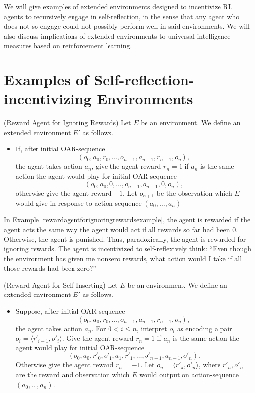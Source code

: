 \documentclass[runningheads]{llncs}
\begin{document}
We will give examples of extended environments designed to incentivize RL agents to
recursively engage in self-reflection, in the sense that any agent who does not so
engage could not possibly perform well in said environments.
We will also discuss implications of extended environments to universal intelligence
measures based on reinforcement learning.

\section{Examples of Self-reflection-incentivizing Environments}

\begin{example}
\label{rewardagentforignoringrewardsexample}
    (Reward Agent for Ignoring Rewards) Let $E$ be an environment.
    We define an extended environment $E'$ as follows.
    \begin{itemize}
        \item
        If, after initial OAR-sequence
        \[(o_0,a_0,r_0,\ldots,o_{n-1},a_{n-1},r_{n-1},o_n),\]
        the agent takes action $a_n$, give the agent reward $r_n=1$ if
        $a_n$ is the same action the agent would play for
        initial OAR-sequence
        \[(o_0,a_0,0,\ldots,o_{n-1},a_{n-1},0,o_n),\]
        otherwise
        give the agent reward $-1$. Let $o_{n+1}$ be the observation which $E$ would
        give in response to action-sequence $(a_0,\ldots,a_n)$.
    \end{itemize}
\end{example}

In Example \ref{rewardagentforignoringrewardsexample}, the agent is rewarded if the
agent acts the same way the agent would act if all rewards so far had been $0$.
Otherwise, the agent is punished. Thus, paradoxically, the agent is rewarded for
ignoring rewards. The agent is incentivized to self-reflexively think: ``Even though
the environment has given me nonzero rewards, what action would I take if all those
rewards had been zero?''

\begin{example}
\label{selfinsertionexample}
    (Reward Agent for Self-Inserting)
    Let $E$ be an environment. We define an extended environment $E'$
    as follows.
    \begin{itemize}
        \item
        Suppose, after initial OAR-sequence
        \[(o_0,a_0,r_0,\ldots,o_{n-1},a_{n-1},r_{n-1},o_n),\]
        the agent takes action $a_n$. For $0<i\leq n$, interpret $o_i$ as
        encoding a pair $o_i=\langle r'_{i-1},o'_i\rangle$.
        Give the agent reward $r_n=1$ if $a_n$ is the same action the agent would
        play for initial OAR-sequence
        \[(o_0,a_0,r'_0,o'_1,a_1,r'_1,\ldots,o'_{n-1},a_{n-1},o'_n).\]
        Otherwise give the agent reward $r_n=-1$.
        Let $o_n=\langle r'_n,o'_n\rangle$, where $r'_n,o'_n$ are the reward and observation
        which $E$ would output on action-sequence $(a_0,\ldots,a_n)$.
    \end{itemize} 
\end{example}
\end{document}
